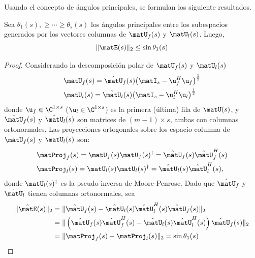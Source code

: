 Usando el concepto de ángulos principales, se formulan los siguiente resultados.

\begin{theorem}\label{The1:ESTER_GAP}
	Sea $\theta_1(s),\ge\cdots\ge\theta_s(s)$ los ángulos principales entre los subespacios generados por los vectores columnas de $\matU_f(s)$ y $\matU_l(s)$. Luego,
	\begin{equation}
		\|\matE(s)\|_2  \le \sin\theta_1(s)
		\label{Eq:ESTERBound}
	\end{equation}
\end{theorem}  
\begin{proof} Considerando la descomposición polar de $\matU_f(s)$ y $\matU_l(s)$
	\begin{equation}
		\begin{aligned}
			& \matU_f(s) = \hat{\matU}_f(s)\big(\matI_s -         \u_f^H\u_f\big)^{\frac{1}{2}}\\
			& \matU_l(s) = \hat{\matU}_l(s)\big(\matI_s -         \u_l^H\u_l\big)^{\frac{1}{2}}
		\end{aligned}
		\label{Eq:nearest_Orthonormal}
	\end{equation}
	donde $\u_f\in\C^{1\times s}$ ($\u_l\in\C^{1\times s}$) es la primera (última) fila de $\matU(s)$, y $\hat{\matU}_f(s)$ y $\hat{\matU}_l(s) $ son matrices de $(m-1)\times s$, ambas con columnas ortonormales. Las proyecciones ortogonales sobre los espacio columna de  $\matU_f(s)$ y $\matU_l(s)$ son:  
	\begin{equation}
		\begin{aligned}
			& \matProj_f(s) = \matU_f(s)\matU_f(s)^\dagger = \hat{\matU}_{f}(s)\hat{\matU}_{f}^H(s) \\
			& \matProj_l(s) = \matU_l(s)\matU_l(s)^\dagger = \hat{\matU}_{l}(s)\hat{\matU}_{l}^H(s),
		\end{aligned}
		\label{Eq:ProjMatrix}
	\end{equation}
	donde $\matU_l(s)^\dagger$ es la pseudo-inversa de Moore-Penrose. 
	Dado que $\hat{\matU}_f$ y $\hat{\matU}_l$ tienen columnas ortonormales, sea
	\[\begin{aligned} \|\hat{\matE}(s)\|_2 & = \|\hat{\matU}_{f}(s) -\hat{\matU}_{l}(s)\hat{\matU}_l^H(s)\hat{\matU}_f(s)\|_2 \\\ & = \|\left(\hat{\matU}_{f}(s)\hat{\matU}_{f}^H(s) -\hat{\matU}_{l}(s)\hat{\matU}_l^H(s)\right)\hat{\matU}_f(s)\|_2\\
		&  = \|\matProj_f(s) - \matProj_l(s)\|_2 = \sin \theta_1(s)
	\end{aligned}
\]
\end{proof}
